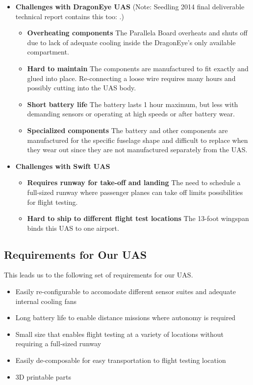 \documentclass{article}
\begin{document}
\begin{itemize}

\item {\bf Challenges with DragonEye UAS} (Note: Seedling 2014 final deliverable technical report contains this too: \cite{RSI15}.)
  \begin{itemize}
    \item {\bf Overheating components} The Parallela Board overheats and shuts off due to lack of adequate cooling inside the DragonEye's only available compartment.
    \item {\bf Hard to maintain} The components are manufactured to fit exactly and glued into place. Re-connecting a loose wire requires many hours and possibly cutting into the UAS body.
    \item {\bf Short battery life} The battery lasts 1 hour maximum, but less with demanding sensors or operating at high speeds or after battery wear.
    \item {\bf Specialized components} The battery and other components are manufactured for the specific fuselage shape and difficult to replace when they wear out since they are not manufactured separately from the UAS.
  \end{itemize}

\item {\bf Challenges with Swift UAS}
  \begin{itemize}
    \item {\bf Requires runway for take-off and landing} The need to schedule a full-sized runway where passenger planes can take off limits possibilities for flight testing.
    \item {\bf Hard to ship to different flight test locations} The 13-foot wingspan binds this UAS to one airport.
  \end{itemize}

\end{itemize}


\subsection{Requirements for Our UAS}

This leads us to the following set of requirements for our UAS.

\begin{itemize}
  \item Easily re-configurable to accomodate different sensor suites and adequate internal cooling fans
  \item Long battery life to enable distance missions where autonomy is required
  \item Small size that enables flight testing at a variety of locations without requiring a full-sized runway
  \item Easily de-composable for easy transportation to flight testing location
  \item 3D printable parts
\end{itemize}
\end{document}
